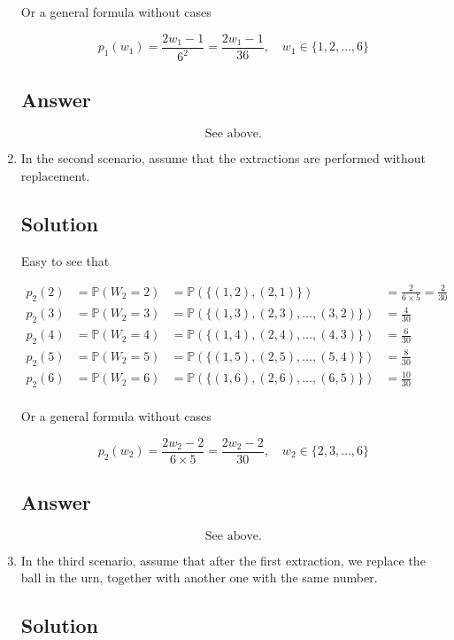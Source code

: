 \documentclass[12pt]{article}
\newcommand{\bP}{\mathbb{P}}
\begin{document}
\begin{enumerate}[start=1,label={\bfseries Part \arabic*:},leftmargin=0in]
			Or a general formula without cases
			
			\[p_1(w_1) = \frac{2w_1-1}{6^2} = \frac{2w_1-1}{36},\quad w_1\in \{1,2,\dots,6\}\]
		
		\subsection*{Answer}
		
			\[\boxed{\text{See above.}}\]
		
		\bigskip\item In the second scenario, assume that the extractions are performed without replacement.
		
		\subsection*{Solution}
		
			Easy to see that
			
			\[
			\begin{aligned}
				p_2(2) &= \bP(W_2 = 2) &= \bP(\{(1,2),(2,1)\}) &= \frac{2}{6\times 5} = \frac{2}{30}\\
				p_2(3) &= \bP(W_2 = 3) &= \bP(\{(1,3),(2,3),\dots,(3,2)\}) &= \frac{4}{30}\\
				p_2(4) &= \bP(W_2 = 4) &= \bP(\{(1,4),(2,4),\dots,(4,3)\}) &= \frac{6}{30}\\
				p_2(5) &= \bP(W_2 = 5) &= \bP(\{(1,5),(2,5),\dots,(5,4)\}) &= \frac{8}{30}\\
				p_2(6) &= \bP(W_2 = 6) &= \bP(\{(1,6),(2,6),\dots,(6,5)\}) &= \frac{10}{30}\\
			\end{aligned}
			\]
			
			Or a general formula without cases
			
			\[p_2(w_2) = \frac{2w_2-2}{6\times 5} = \frac{2w_2-2}{30},\quad w_2\in \{2,3,\dots,6\}\]
		
		\subsection*{Answer}
		
			\[\boxed{\text{See above.}}\]
			
		\bigskip\item In the third scenario, assume that after the first extraction, we replace the ball in the urn, together with another one with the same number.
		
		\subsection*{Solution}
		

\end{enumerate}
\end{document}
